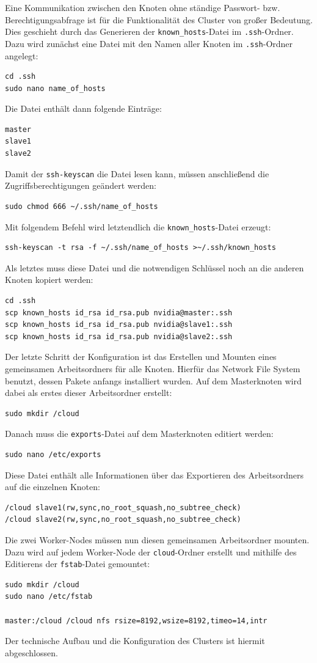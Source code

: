 \documentclass[doktyp=semarbeit, sprache=german]{TUBAFarbeiten}
\begin{document}
Eine Kommunikation zwischen den Knoten ohne ständige Passwort- bzw. Berechtigungsabfrage ist für die Funktionalität des Cluster von großer Bedeutung. Dies geschieht durch das Generieren der \texttt{known\_hosts}-Datei im \texttt{.ssh}-Ordner.  Dazu wird zunächst eine Datei mit den Namen aller Knoten im \texttt{.ssh}-Ordner angelegt:
\begin{lstlisting}
cd .ssh
sudo nano name_of_hosts
\end{lstlisting}
Die Datei enthält dann folgende Einträge:
\begin{lstlisting}
master
slave1
slave2
\end{lstlisting}
Damit der \texttt{ssh-keyscan} die Datei lesen kann, müssen anschließend die Zugriffsberechtigungen geändert werden:
\begin{lstlisting}
sudo chmod 666 ~/.ssh/name_of_hosts
\end{lstlisting}
Mit folgendem Befehl wird letztendlich die \texttt{known\_hosts}-Datei erzeugt:
\begin{lstlisting}
ssh-keyscan -t rsa -f ~/.ssh/name_of_hosts >~/.ssh/known_hosts
\end{lstlisting}
Als letztes muss diese Datei und die notwendigen Schlüssel noch an die anderen Knoten kopiert werden:
\begin{lstlisting}
cd .ssh
scp known_hosts id_rsa id_rsa.pub nvidia@master:.ssh
scp known_hosts id_rsa id_rsa.pub nvidia@slave1:.ssh
scp known_hosts id_rsa id_rsa.pub nvidia@slave2:.ssh
\end{lstlisting}
Der letzte Schritt der Konfiguration ist das Erstellen und Mounten eines gemeinsamen Arbeitsordners für alle Knoten. Hierfür das Network File System benutzt, dessen Pakete anfangs installiert wurden. Auf dem Masterknoten wird dabei als erstes dieser Arbeitsordner erstellt:
\begin{lstlisting}
sudo mkdir /cloud
\end{lstlisting}
Danach muss die \texttt{exports}-Datei auf dem Masterknoten editiert werden:
\begin{lstlisting}
sudo nano /etc/exports
\end{lstlisting}
Diese Datei enthält alle Informationen über das Exportieren des Arbeitsordners auf die einzelnen Knoten:
\begin{lstlisting}
/cloud slave1(rw,sync,no_root_squash,no_subtree_check)
/cloud slave2(rw,sync,no_root_squash,no_subtree_check)
\end{lstlisting}
Die zwei Worker-Nodes müssen nun diesen gemeinsamen Arbeitsordner mounten. Dazu wird auf jedem Worker-Node der \texttt{cloud}-Ordner erstellt und mithilfe des Editierens der \texttt{fstab}-Datei gemountet:
\begin{lstlisting}
sudo mkdir /cloud
sudo nano /etc/fstab

master:/cloud /cloud nfs rsize=8192,wsize=8192,timeo=14,intr
\end{lstlisting}
Der technische Aufbau und die Konfiguration des Clusters ist hiermit abgeschlossen.
\end{document}
